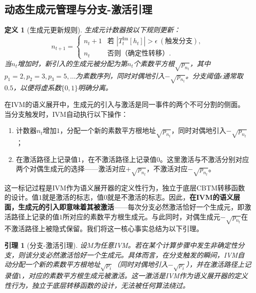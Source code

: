 \documentclass{ctexart}
\newtheorem{lemma}[theorem]{引理}
\newtheorem{definition}[theorem]{定义}
\begin{document}
	\subsection{动态生成元管理与分支-激活引理}
	
	\begin{definition}[生成元更新规则]\label{def:generator-update}
		生成元计数器按以下规则更新：
		\[
		n_{t+1} = \begin{cases}
			n_t + 1 & \text{若 } |T_t^{\mathrm{Im}}[h_t]| > \epsilon \ (\text{触发分支}), \\
			n_t & \text{否则（确定性转移）}.
		\end{cases}
		\]
		当$n_t$增加时，新引入的生成元被分配为第$n_t$个素数平方根$\sqrt{p_{n_t}}$，其中$p_1=2,p_2=3,p_3=5,\dots$为素数序列，同时对偶地引入$-\sqrt{p_{n_t}}$。分支阈值$\epsilon$通常取$0.5$，以便将虚系数$\{0,1\}$明确分离。
	\end{definition}
	
	在IVM的语义展开中，生成元的引入与激活是同一事件的两个不可分割的侧面。当分支触发时，IVM自动执行以下操作：
	\begin{enumerate}
		\item 计数器$n_t$增加$1$，分配一个新的素数平方根地址$\sqrt{p_{n_t}}$，同时对偶地引入$-\sqrt{p_{n_t}}$；
		\item 在激活路径上记录值$1$，在不激活路径上记录值$0$。这里激活与不激活分别对应两个对偶生成元的选择——激活对应$+\sqrt{p_{n_t}}$，不激活对应$-\sqrt{p_{n_t}}$。
	\end{enumerate}
	这一标记过程是IVM作为语义展开器的定义性行为，独立于底层CBTM转移函数的设计。值$1$就是激活的标志，值$0$就是不激活的标志。因此，\textbf{在IVM的语义层面，生成元的引入即意味着其被激活}——每次分支必然激活恰好一个生成元，即激活路径上记录的值$1$所对应的素数平方根生成元。与此同时，对偶生成元$-\sqrt{p_{n_t}}$在不激活路径上被隐式保留。我们将这一核心事实总结为以下引理。
	
	\begin{lemma}[分支-激活引理]\label{lem:branch-activate}
		设$M$为任意IVM。若在某个计算步骤中发生非确定性分支，则该分支必然激活恰好一个生成元。具体而言，在分支触发的瞬间，IVM自动分配一个新的素数平方根地址$\sqrt{p_i}$（同时对偶地引入$-\sqrt{p_i}$），并在激活路径上记录值$1$，对应的素数平方根生成元被激活。这一激活是IVM作为语义展开器的定义性行为，独立于底层转移函数的设计，无法被任何算法绕过。
	\end{lemma}
	
\end{document}
